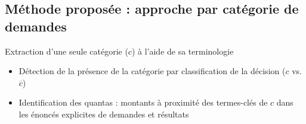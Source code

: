 \subsection{Méthode proposée : approche par catégorie de demandes}

\begin{frame}[t]{\mysubsectiontitle}
	Extraction d'une seule catégorie ($c$) à l'aide de sa terminologie
	
	\begin{itemize} \scriptsize	
		\item Détection de la présence de la catégorie par classification de la décision ($c$ vs. $\overline{c}$)
		\item Identification des quantas : montants à proximité des termes-clés de $c$ dans les énoncés explicites de demandes et résultats		

		

\end{itemize}
\end{frame}
